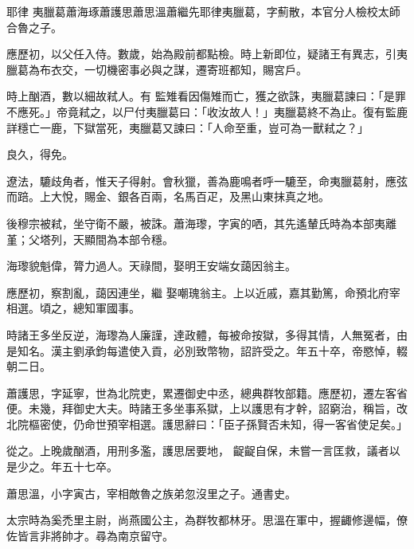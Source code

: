 
\begin{pinyinscope}

 耶律
 夷臘葛蕭海琢蕭護思蕭思溫蕭繼先耶律夷臘葛，字薊散，本官分人檢校太師合魯之子。



 應歷初，以父任入侍。數歲，始為殿前都點檢。時上新即位，疑諸王有異志，引夷臘葛為布衣交，一切機密事必與之謀，遷寄班都知，賜宮戶。



 時上酗酒，數以細故弒人。有
 監雉看因傷雉而亡，獲之欲誅，夷臘葛諫曰：「是罪不應死。」帝竟弒之，以尸付夷臘葛曰：「收汝故人！」夷臘葛終不為止。復有監鹿詳穩亡一鹿，下獄當死，夷臘葛又諫曰：「人命至重，豈可為一獸弒之？」



 良久，得免。



 遼法，騼歧角者，惟天子得射。會秋獵，善為鹿鳴者呼一騼至，命夷臘葛射，應弦而踣。上大悅，賜金、銀各百兩，名馬百疋，及黑山東抹真之地。



 後穆宗被弒，坐守衛不嚴，被誅。蕭海瓈，字寅的哂，其先遙輦氏時為本部夷離堇；父塔列，天顯間為本部令穩。



 海瓈貌魁偉，膂力過人。天祿間，娶明王安端女藹因翁主。



 應歷初，察割亂，藹因連坐，繼
 娶嘲瑰翁主。上以近戚，嘉其勤篤，命預北府宰相選。頃之，總知軍國事。



 時諸王多坐反逆，海瓈為人廉謹，達政體，每被命按獄，多得其情，人無冤者，由是知名。漢主劉承鈞每遣使入貢，必別致幣物，詔許受之。年五十卒，帝愍悼，輟朝二日。



 蕭護思，字延寧，世為北院吏，累遷御史中丞，總典群牧部籍。應歷初，遷左客省便。未幾，拜御史大夫。時諸王多坐事系獄，上以護思有才幹，詔窮治，稱旨，改北院樞密使，仍命世預宰相選。護思辭曰：「臣子孫賢否未知，得一客省使足矣。」



 從之。上晚歲酗酒，用刑多濫，護思居要地，
 齪齪自保，未嘗一言匡救，議者以是少之。年五十七卒。



 蕭思溫，小字寅古，宰相敵魯之族弟忽沒里之子。通書史。



 太宗時為奚禿里主尉，尚燕國公主，為群牧都林牙。思溫在軍中，握齱修邊幅，僚佐皆言非將帥才。尋為南京留守。




\end{pinyinscope}
